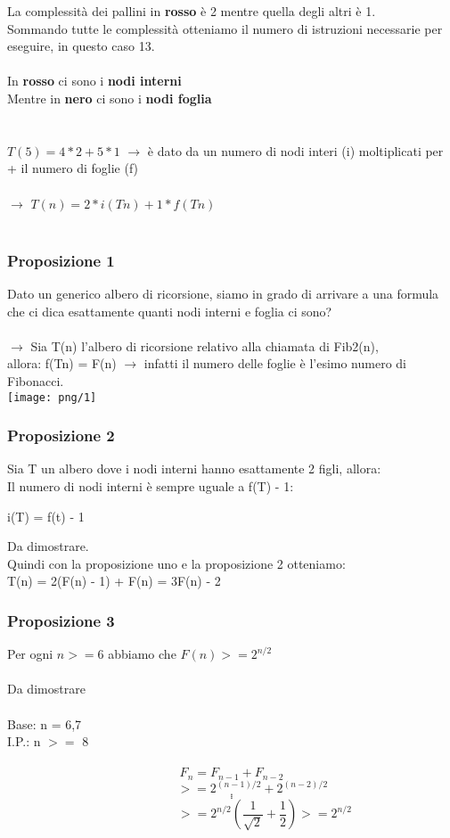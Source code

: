 \documentclass[12pt, letterpaper]{article}
\begin{document}
La complessità dei pallini in \textbf{rosso} è 2 mentre quella degli altri è 1.
\\
Sommando tutte le complessità otteniamo il numero di istruzioni necessarie per eseguire, in questo caso 13.
\\
\\
In \textbf{rosso} ci sono i \textbf{nodi interni}
\\
Mentre in \textbf{nero} ci sono i \textbf{nodi foglia}
\\
\\
\\$T(5) = 4*2 + 5*1$ $\rightarrow$ è\; dato\; da \;un\; numero\; di\; nodi\; interi \;(i)\; moltiplicati\; per\;
+\; il\; numero\; di\; foglie\; (f)
\\
\\
$\rightarrow$ \(T(n) = 2 * i(Tn) + 1 * f(Tn) \)
\\
\\
\newpage
\subsubsection{Proposizione 1}
Dato un generico albero di ricorsione, siamo in grado di arrivare a una formula che ci dica esattamente quanti nodi interni e foglia ci sono?
\\
\\
$\rightarrow$ Sia T(n) l'albero di ricorsione relativo alla chiamata di Fib2(n),
\\allora: f(Tn) = F(n) $\rightarrow$ infatti il numero delle foglie è l'esimo numero di Fibonacci.
\\

\texttt{[image: png/1]}
\subsubsection{Proposizione 2}
Sia T un albero dove i nodi interni hanno esattamente 2 figli, allora:
\\Il numero di nodi interni è sempre uguale a f(T) - 1:
\begin{center}i(T) = f(t) - 1\end{center}
Da dimostrare.
\\
Quindi con la proposizione uno e la proposizione 2 otteniamo:\\
T(n) = 2(F(n) - 1) + F(n) = 3F(n) - 2
\subsubsection{Proposizione 3}
Per ogni $n >= 6$ abbiamo che $F(n) >= 2^{n/2}$
\\
\\Da dimostrare
\\
\\
Base: n = 6,7\\
I.P.: n $>=$ 8\\
\\
\[F_n = F_{n-1} + F_{n-2}\]
\[\;\;\;\;\;\;\;\;\;\;\;\;  >= 2^{(n-1) / 2} + 2^{(n-2)/2}\]
\[.\]
\[.\]
\[.\]
\[\;\;\;\;\;\;\;\;\;\;\;\;\;\;\;\;\;\;\;  >= 2^{n/2}(\frac{1}{\sqrt{2}}+\frac{1}{2}) >= 2^{n/2}\]
\end{document}
